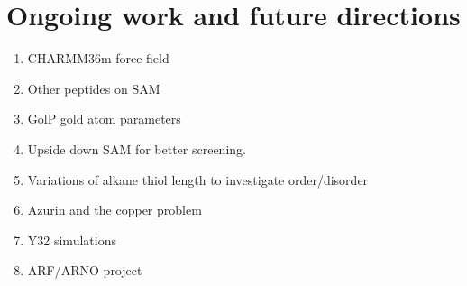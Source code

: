 \chapter{Ongoing work and future directions} \label{future}

\begin{enumerate}
    \item{CHARMM36m force field} 
    \item{Other peptides on SAM} 
    \item{GolP gold atom parameters} 
    \item{Upside down SAM for better screening.} 
    \item{Variations of alkane thiol length to investigate order/disorder}
    \item{Azurin and the copper problem}
    \item{Y32 simulations} 
    \item{ARF/ARNO project}

\end{enumerate}
